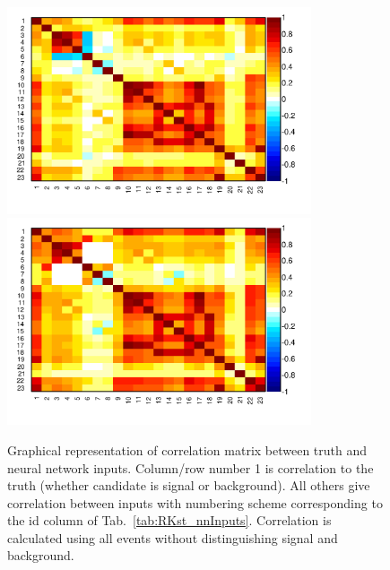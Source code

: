 \begin{figure}
\centering
\includegraphics[width=0.8\textwidth]{RKst/figs/Training/electrons/correlation.pdf}
\includegraphics[width=0.8\textwidth]{RKst/figs/Training/muons/correlation.pdf}
\caption{Graphical representation of correlation matrix between truth and neural network inputs.
Column/row number 1 is correlation to the truth (whether candidate is signal or background). All
others give correlation between inputs with numbering scheme corresponding to the id column of
Tab.~\ref{tab:RKst_nnInputs}. Correlation is calculated using all events without distinguishing signal and
background.}
\label{fig:Rkst_nnCorrelation}
\end{figure}
%

